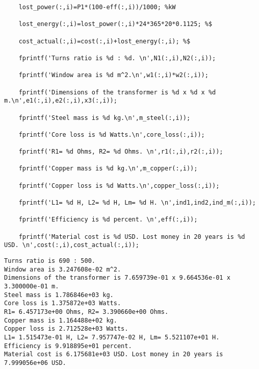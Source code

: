 \begin{verbatim}
    lost_power(:,i)=P1*(100-eff(:,i))/1000; %kW

    lost_energy(:,i)=lost_power(:,i)*24*365*20*0.1125; %$

    cost_actual(:,i)=cost(:,i)+lost_energy(:,i); %$

    fprintf('Turns ratio is %d : %d. \n',N1(:,i),N2(:,i));

    fprintf('Window area is %d m^2.\n',w1(:,i)*w2(:,i));

    fprintf('Dimensions of the transformer is %d x %d x %d m.\n',e1(:,i),e2(:,i),x3(:,i));

    fprintf('Steel mass is %d kg.\n',m_steel(:,i));

    fprintf('Core loss is %d Watts.\n',core_loss(:,i));

    fprintf('R1= %d Ohms, R2= %d Ohms. \n',r1(:,i),r2(:,i));

    fprintf('Copper mass is %d kg.\n',m_copper(:,i));

    fprintf('Copper loss is %d Watts.\n',copper_loss(:,i));

    fprintf('L1= %d H, L2= %d H, Lm= %d H. \n',ind1,ind2,ind_m(:,i));

    fprintf('Efficiency is %d percent. \n',eff(:,i));

    fprintf('Material cost is %d USD. Lost money in 20 years is %d USD. \n',cost(:,i),cost_actual(:,i));
\end{verbatim}

        \color{lightgray} \begin{verbatim}Turns ratio is 690 : 500. 
Window area is 3.247608e-02 m^2.
Dimensions of the transformer is 7.659739e-01 x 9.664536e-01 x 3.300000e-01 m.
Steel mass is 1.786846e+03 kg.
Core loss is 1.375872e+03 Watts.
R1= 6.457173e+00 Ohms, R2= 3.390660e+00 Ohms. 
Copper mass is 1.164488e+02 kg.
Copper loss is 2.712528e+03 Watts.
L1= 1.515473e-01 H, L2= 7.957747e-02 H, Lm= 5.521107e+01 H. 
Efficiency is 9.918895e+01 percent. 
Material cost is 6.175681e+03 USD. Lost money in 20 years is 7.999056e+06 USD. 
\end{verbatim} \color{black}
    



    
